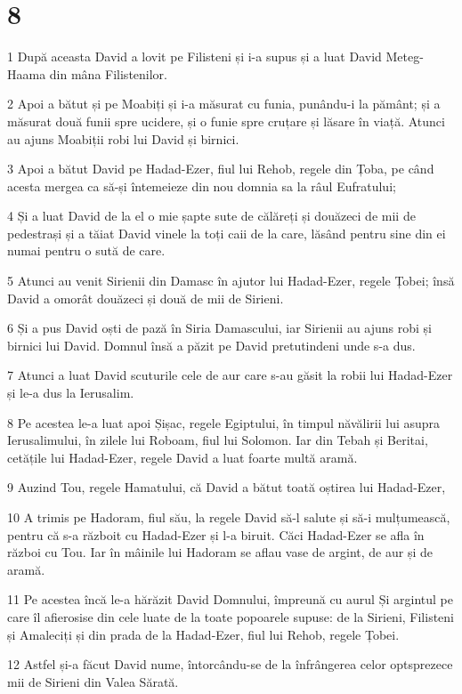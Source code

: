 \chapter{8}

\par 1 După aceasta David a lovit pe Filisteni și i-a supus și a luat David Meteg-Haama din mâna Filistenilor.
\par 2 Apoi a bătut și pe Moabiți și i-a măsurat cu funia, punându-i la pământ; și a măsurat două funii spre ucidere, și o funie spre cruțare și lăsare în viață. Atunci au ajuns Moabiții robi lui David și birnici.
\par 3 Apoi a bătut David pe Hadad-Ezer, fiul lui Rehob, regele din Țoba, pe când acesta mergea ca să-și întemeieze din nou domnia sa la râul Eufratului;
\par 4 Și a luat David de la el o mie șapte sute de călăreți și douăzeci de mii de pedestrași și a tăiat David vinele la toți caii de la care, lăsând pentru sine din ei numai pentru o sută de care.
\par 5 Atunci au venit Sirienii din Damasc în ajutor lui Hadad-Ezer, regele Țobei; însă David a omorât douăzeci și două de mii de Sirieni.
\par 6 Și a pus David oști de pază în Siria Damascului, iar Sirienii au ajuns robi și birnici lui David. Domnul însă a păzit pe David pretutindeni unde s-a dus.
\par 7 Atunci a luat David scuturile cele de aur care s-au găsit la robii lui Hadad-Ezer și le-a dus la Ierusalim.
\par 8 Pe acestea le-a luat apoi Șișac, regele Egiptului, în timpul năvălirii lui asupra Ierusalimului, în zilele lui Roboam, fiul lui Solomon. Iar din Tebah și Beritai, cetățile lui Hadad-Ezer, regele David a luat foarte multă aramă.
\par 9 Auzind Tou, regele Hamatului, că David a bătut toată oștirea lui Hadad-Ezer,
\par 10 A trimis pe Hadoram, fiul său, la regele David să-l salute și să-i mulțumească, pentru că s-a războit cu Hadad-Ezer și l-a biruit. Căci Hadad-Ezer se afla în război cu Tou. Iar în mâinile lui Hadoram se aflau vase de argint, de aur și de aramă.
\par 11 Pe acestea încă le-a hărăzit David Domnului, împreună cu aurul Și argintul pe care îl afierosise din cele luate de la toate popoarele supuse: de la Sirieni, Filisteni și Amaleciți și din prada de la Hadad-Ezer, fiul lui Rehob, regele Țobei.
\par 12 Astfel și-a făcut David nume, întorcându-se de la înfrângerea celor optsprezece mii de Sirieni din Valea Sărată.
